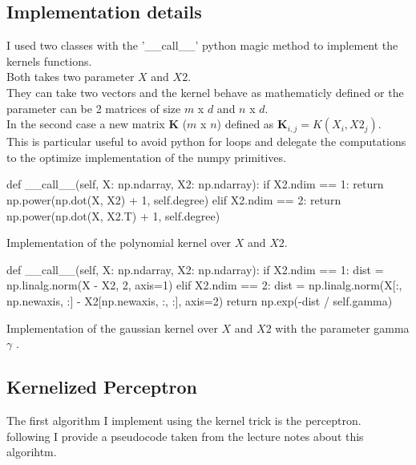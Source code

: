 \subsection{Implementation details}
I used two classes with the '\_\_call\_\_' python magic method to implement the kernels functions.\\
Both takes two parameter $X$ and $X2$.\\
They can take two vectors and the kernel behave as mathematicly defined or the parameter can be 2 matrices of size $m$ x $d$ and $n$ x $d$.\\
In the second case a new matrix $\boldsymbol{K}$ ($m$ x $n$) defined as $\boldsymbol{K}_{i, j} = K(X_i, X2_j)$.\\
This is particular useful to avoid python for loops and delegate the computations to the optimize implementation of the numpy primitives.\\

\begin{python}
def __call__(self, X: np.ndarray, X2: np.ndarray):
    if X2.ndim == 1:
        return np.power(np.dot(X, X2) + 1, self.degree)
    elif X2.ndim == 2:
        return np.power(np.dot(X, X2.T) + 1, self.degree)
\end{python}
Implementation of the polynomial kernel over $X$ and $X2$.\\

\begin{python}
    def __call__(self, X: np.ndarray, X2: np.ndarray):
        if X2.ndim == 1:
            dist = np.linalg.norm(X - X2, 2, axis=1)
        elif X2.ndim == 2:
            dist = np.linalg.norm(X[:, np.newaxis, :] - X2[np.newaxis, :, :], axis=2)
        return np.exp(-dist / self.gamma)
\end{python}
Implementation of the gaussian kernel over $X$ and $X2$ with the parameter gamma $\gamma$ .\\

\subsection{Kernelized Perceptron}

The first algorithm I implement using the kernel trick is the perceptron.\\
following I provide a pseudocode taken from the lecture notes about this algorihtm.\\ 


